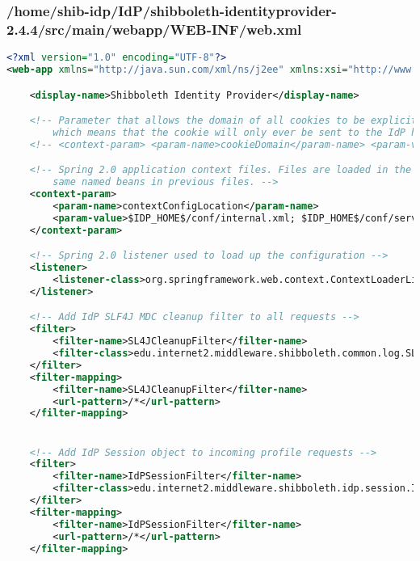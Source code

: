 \subsubsection{/home/shib-idp/IdP/shibboleth-identityprovider-2.4.4/src/main/webapp/WEB-INF/web.xml}
\begin{lstlisting}[language=xml]
<?xml version="1.0" encoding="UTF-8"?>
<web-app xmlns="http://java.sun.com/xml/ns/j2ee" xmlns:xsi="http://www.w3.org/2001/XMLSchema-instance" xsi:schemaLocation="http://java.sun.com/xml/ns/j2ee http://java.sun.com/xml/ns/j2ee/web-app_2_4.xsd" version="2.4">

    <display-name>Shibboleth Identity Provider</display-name>

    <!-- Parameter that allows the domain of all cookies to be explicitly set. If not set the domain is left empty
        which means that the cookie will only ever be sent to the IdP host. -->
    <!-- <context-param> <param-name>cookieDomain</param-name> <param-value>example.org</param-value> </context-param> -->

    <!-- Spring 2.0 application context files. Files are loaded in the order they appear with subsequent files overwriting
        same named beans in previous files. -->
    <context-param>
        <param-name>contextConfigLocation</param-name>
        <param-value>$IDP_HOME$/conf/internal.xml; $IDP_HOME$/conf/service.xml; $IDP_HOME$/conf/uApprove.xml;</param-value>
    </context-param>

    <!-- Spring 2.0 listener used to load up the configuration -->
    <listener>
        <listener-class>org.springframework.web.context.ContextLoaderListener</listener-class>
    </listener>

    <!-- Add IdP SLF4J MDC cleanup filter to all requests -->
    <filter>
        <filter-name>SL4JCleanupFilter</filter-name>
        <filter-class>edu.internet2.middleware.shibboleth.common.log.SLF4JMDCCleanupFilter</filter-class>
    </filter>
    <filter-mapping>
        <filter-name>SL4JCleanupFilter</filter-name>
        <url-pattern>/*</url-pattern>
    </filter-mapping>


    <!-- Add IdP Session object to incoming profile requests -->
    <filter>
        <filter-name>IdPSessionFilter</filter-name>
        <filter-class>edu.internet2.middleware.shibboleth.idp.session.IdPSessionFilter</filter-class>
    </filter>
    <filter-mapping>
        <filter-name>IdPSessionFilter</filter-name>
        <url-pattern>/*</url-pattern>
    </filter-mapping>


\end{lstlisting}
